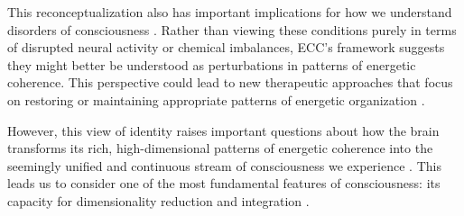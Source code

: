 This reconceptualization also has important implications for how we understand disorders of consciousness \cite{shapiro2000multiple}. Rather than viewing these conditions purely in terms of disrupted neural activity or chemical imbalances, ECC's framework suggests they might better be understood as perturbations in patterns of energetic coherence. This perspective could lead to new therapeutic approaches that focus on restoring or maintaining appropriate patterns of energetic organization \cite{wilson2001two}.

However, this view of identity raises important questions about how the brain transforms its rich, high-dimensional patterns of energetic coherence into the seemingly unified and continuous stream of consciousness we experience \cite{kim1992multiple}. This leads us to consider one of the most fundamental features of consciousness: its capacity for dimensionality reduction and integration \cite{lewis1966argument}.

